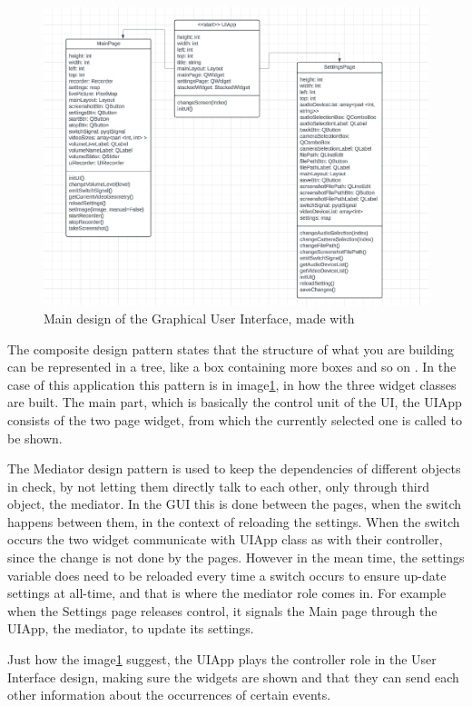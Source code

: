 \begin{figure}
    \centering
    \includegraphics[width=0.8\linewidth]{figures/UIDesignPattern.png}
    \caption{Main design of the Graphical User Interface, made with \cite{lucidchart}}
    \label{fig:uidesignpattern}
\end{figure}

\par The composite design pattern states that the structure of what you are building can be represented in a tree, like a box containing more boxes and so on \cite{composite}. In the case of this application this pattern is in image\ref{fig:uidesignpattern}, in how the three widget classes are built. The main part, which is basically the control unit of the UI, the UIApp consists of the two page widget, from which the currently selected one is called to be shown.
\par The Mediator design pattern is used to keep the dependencies of different objects in check, by not letting them directly talk to each other, only through third object, the mediator\cite{mediator}. In the GUI this is done between the pages, when the switch happens between them, in the context of reloading the settings. When the switch occurs the two widget communicate with UIApp class as with their controller, since the change is not done by the pages. However in the mean time, the settings variable does need to be reloaded every time a switch occurs to ensure up-date settings at all-time, and that is where the mediator role comes in. For example when the Settings page releases control, it signals the Main page through the UIApp, the mediator, to update its settings.
\par Just how the image\ref{fig:uidesignpattern} suggest, the UIApp plays the controller role in the User Interface design, making sure the widgets are shown and that they can send each other information about the occurrences of certain events.

